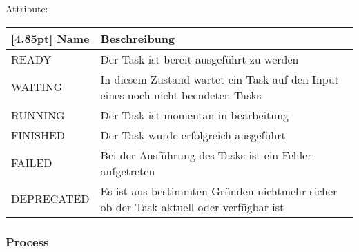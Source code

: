 			Attribute:
			\begin{center}
            	\renewcommand{\arraystretch}{1.5}
	            \setlength\tabcolsep{5pt}
            	\begin{tabularx}{\textwidth}{|l|X|}
            		\hline
                    \rowcolor[gray]{0.75}[4.85pt]
            	    Name & Beschreibung \\ \hline
            	    READY & Der Task ist bereit ausgeführt zu werden \\ \hline
            		WAITING & In diesem Zustand wartet ein Task auf den Input eines noch nicht beendeten Tasks \\ \hline
            		RUNNING & Der Task ist momentan in bearbeitung \\ \hline
            		FINISHED & Der Task wurde erfolgreich ausgeführt \\ \hline
            		FAILED & Bei der Ausführung des Tasks ist ein Fehler aufgetreten \\ \hline
            		DEPRECATED & Es ist aus bestimmten Gründen nichtmehr sicher ob der Task aktuell oder verfügbar ist\\ \hline
				\end{tabularx}
			\end{center}
                
    		\subsubsection{Process}
    		
